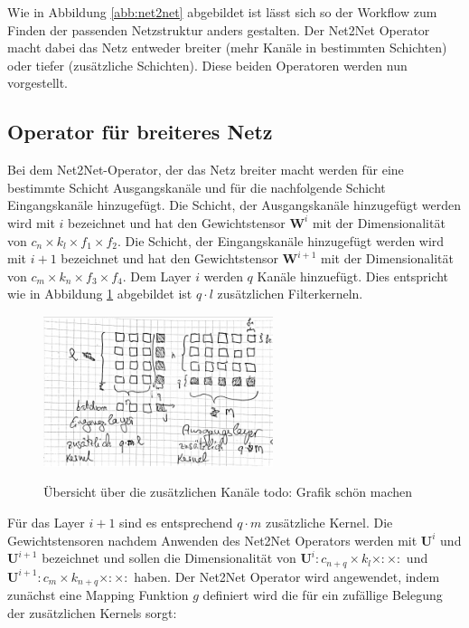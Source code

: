 Wie in Abbildung \ref{abb:net2net} abgebildet ist lässt sich so der Workflow zum Finden der passenden Netzstruktur anders gestalten. Der Net2Net Operator macht dabei das Netz entweder breiter (mehr Kanäle in bestimmten Schichten) oder tiefer (zusätzliche Schichten). Diese beiden Operatoren werden nun vorgestellt.

\subsection{Operator für breiteres Netz}
Bei dem Net2Net-Operator, der das Netz breiter macht werden für eine bestimmte Schicht Ausgangskanäle und für die nachfolgende Schicht Eingangskanäle hinzugefügt. Die Schicht, der Ausgangskanäle hinzugefügt werden wird mit $i$ bezeichnet und hat den Gewichtstensor $\mathbf{W}^i$ mit der Dimensionalität von $c_n \times k_l \times f_1 \times f_2$. Die Schicht, der Eingangskanäle hinzugefügt werden wird mit $i+1$ bezeichnet und hat den Gewichtstensor $\mathbf{W}^{i+1}$ mit der Dimensionalität von $c_m \times k_n \times f_3 \times f_4$. Dem Layer $i$ werden $q$ Kanäle hinzuefügt. Dies entspricht wie in Abbildung \ref{abb:channels} abgebildet ist $q \cdot l $ zusätzlichen Filterkerneln. 

\begin{figure}[h]
 \centering
 \includegraphics[width=0.6\textwidth]{KapitelPartA/images/channels.png}
 \label{abb:channels}
 \caption{Übersicht über die zusätzlichen Kanäle todo: Grafik schön machen}
\end{figure}



Für das Layer $i+1$ sind es entsprechend $q \cdot m $ zusätzliche Kernel. Die Gewichtstensoren nachdem Anwenden des Net2Net Operators werden mit $\mathbf{U}^i$ und $\mathbf{U}^{i+1}$ bezeichnet und sollen die Dimensionalität von $\mathbf{U}^i: c_{n+q} \times k_l \times : \times :$ und $\mathbf{U}^{i+1}: c_m \times k_{n+q} \times : \times :$ haben. Der Net2Net Operator wird angewendet, indem zunächst eine Mapping Funktion $g$ definiert wird die für ein zufällige Belegung der zusätzlichen Kernels sorgt:

